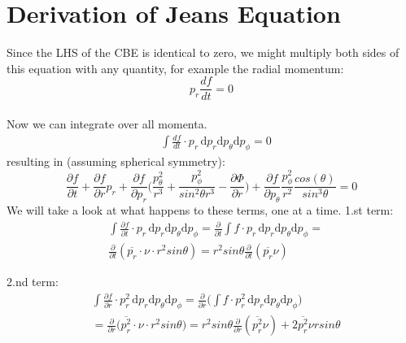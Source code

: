 \section{Derivation of Jeans Equation}
Since the LHS of the CBE is identical to zero, we might multiply both sides of this equation with any quantity, for example the radial momentum: \\
\begin{equation}
p_r \frac{df}{dt} = 0 
\end{equation} \\
Now we can integrate over all momenta.
\begin{equation}
\begin{aligned}
& \int \! \frac{d f}{d t}\cdot p_r \, \mathrm{d}p_r \mathrm{d}p_{\theta} \mathrm{d}p_{\phi} = 0
\end{aligned}
\end{equation}
resulting in (assuming spherical symmetry): 
\begin{equation}
\frac{\partial f}{\partial t} + \frac{\partial f}{\partial r}p_r + \frac{\partial f}{\partial p_r}\big(\frac{p_{\theta}^2}{r^3} + \frac{p_{\phi}^2}{sin^2\theta r^3} - \frac{\partial \Phi}{\partial r} \big) + \frac{\partial f}{\partial p_{\theta}}\frac{p_{\phi}^2}{r^2}\frac{cos(\theta)}{sin^3 \theta} = 0
\end{equation}
We will take a look at what happens to these terms, one at a time. 1.st term:
\begin{equation}
\begin{aligned}
& \int \! \frac{\partial f}{\partial t}\cdot p_r \, \mathrm{d}p_r \mathrm{d}p_{\theta} \mathrm{d}p_{\phi}
= \frac{\partial}{\partial t} \int \! f \cdot p_r \, \mathrm{d}p_r \mathrm{d}p_{\theta} \mathrm{d}p_{\phi} = \\
& \frac{\partial}{\partial t}(\overline{p_r}\cdot \nu \cdot r^2sin\theta)
= r^2 sin\theta \frac{\partial}{\partial t}(\overline{p_r} \nu)
\end{aligned}
\end{equation}

2.nd term:
\begin{equation}
\begin{aligned}
& \int \! \frac{\partial f}{\partial r}\cdot p_r^2 \, \mathrm{d}p_r \mathrm{d}p_{\theta} \mathrm{d}p_{\phi}
= \frac{\partial}{\partial r}\Bigg( \int \! f \cdot p_r^2 \, \mathrm{d}p_r \mathrm{d}p_{\theta} \mathrm{d}p_{\phi}\Bigg) \\
& = \frac{\partial}{\partial r}\bigg(\overline{p_r^2}\cdot \nu \cdot r^2sin\theta \bigg)
= r^2 sin\theta \frac{\partial}{\partial r}(\overline{p_r^2} \nu) + 2\overline{p_r^2}\nu r sin \theta
\end{aligned}
\end{equation}

